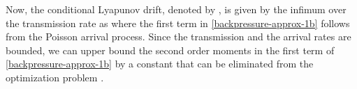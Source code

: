 Now, the conditional Lyapunov drift, denoted by , is given by the infimum over the transmission rate as
\iftoggle{single_column}{
\begin{IEEEeqnarray}{rCl} \label{backpressure-approx}
	\underset{\mbf{t}}{\text{inf}} && \Delta(\mbf{Q}(i)) \triangleq \mathbb{E}_{\mbfa{\lambda},\mbf{t}} \set{\mathrm{L}\sset{\mbf{Q}(i+1)} - \mathrm{L}\sset{\mbf{Q}(i)} \vert \mbf{Q}(i)} \IEEEyessubnumber \\
	&\leq& \underbrace{\mathbb{E}_{\mbfa{\lambda},\mbf{t}} \set {\sum_{k \in \mc{U}} \, \frac{\lambda^2_k(i) + t_k^2(i)}{2} \vert \mbf{Q}(i)}}_{\le B} + \sum_{k \in \mc{U}} Q_k(i) A_k(i) - \mathbb{E}_{\mbfa{\lambda},\mbf{t}}\set{\sum_{k \in \mc{U}} Q_k(i) t_k(i)  \vert \mbf{Q}(i)}, \eqsub \label{backpressure-approx-1b}
\end{IEEEeqnarray}}{
{\allowdisplaybreaks
\begin{IEEEeqnarray}{CL} \label{backpressure-approx}
	\underset{\mbf{t}}{\text{inf}} \quad & \mathbb{E}_{\mbfa{\lambda},\mbf{t}} \set{\mathrm{L}\sset{\mbf{Q}(i+1)} - \mathrm{L}\sset{\mbf{Q}(i)} \vert \mbf{Q}(i)} \IEEEyessubnumber \\
	\leq & \underbrace{\mathbb{E}_{\mbfa{\lambda},\mbf{t}} \Big \lbrace \sum_{k \in \mc{U}} \frac{\lambda^2_k(i) + t_k^2(i)}{2} \vert \mbf{Q}(i) \Big \rbrace }_{\le B} + \sum_{k \in \mc{U}} Q_k(i) A_k(i) \nonumber \\
	& \qquad \qquad {} - \mathbb{E}_{\mbfa{\lambda},\mbf{t}}\Big \lbrace \sum_{k \in \mc{U}} Q_k(i) t_k(i)  \vert \mbf{Q}(i) \Big \rbrace, \eqsub \label{backpressure-approx-1b}
\end{IEEEeqnarray}}}
where the first term in \eqref{backpressure-approx-1b} follows from the Poisson arrival process. Since the transmission and the arrival rates are bounded, we can upper bound the second order moments in the first term of \eqref{backpressure-approx-1b} by a constant  that can be eliminated from the optimization problem \cite{neely2010stochastic}.

